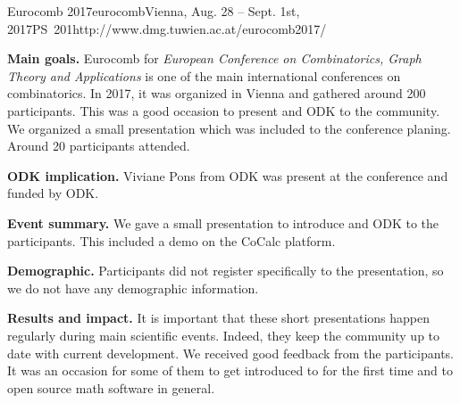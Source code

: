 \begin{event}{Eurocomb 2017}{eurocomb}{Vienna, Aug. 28 -- Sept. 1st, 2017}{PS}{~20}{1}{http://www.dmg.tuwien.ac.at/eurocomb2017/}

\textbf{Main goals.} Eurocomb for \textit{European Conference on Combinatorics, Graph Theory and Applications} is one of the main international conferences on combinatorics. In 2017, it was organized in Vienna and gathered around 200 participants. This was a good occasion to present \Sage and ODK to the community. We organized a small presentation which was included to the conference planing. Around 20 participants attended.

\textbf{ODK implication.} Viviane Pons from ODK was present at the conference and funded by ODK.

\textbf{Event summary.} We gave a small presentation to introduce \Sage and ODK to the participants. This included a demo on the CoCalc platform.

\textbf{Demographic.} Participants did not register specifically to the \Sage presentation, so we do not have any demographic information.

\textbf{Results and impact.} It is important that these short presentations happen regularly during main scientific events. Indeed, they keep the community up to date with current development. We received good feedback from the participants. It was an occasion for some of them to get introduced to \Sage for the first time and to open source math software in general.

\end{event}